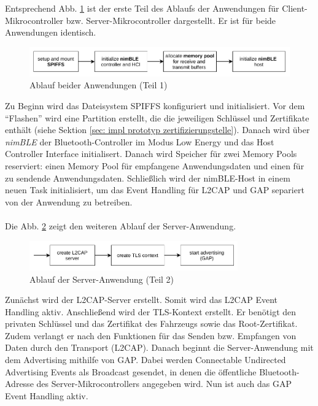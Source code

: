 Entsprechend Abb. \ref{fig: impl ablauf anwendung teil 1} ist der erste Teil des Ablaufs der Anwendungen für Client-Mikrocontroller bzw. Server-Mikrocontroller dargestellt. Er ist für beide Anwendungen identisch.
\begin{figure}[H]
    \centering
    \includegraphics[width=1\textwidth]{graphics/ablauf_anwendung_teil_1.pdf}
    \caption[Ablauf beider Anwendungen (Teil 1)]{Ablauf beider Anwendungen (Teil 1)}
    \label{fig: impl ablauf anwendung teil 1}
\end{figure}
Zu Beginn wird das Dateisystem SPIFFS konfiguriert und initialisiert. Vor dem "`Flashen"' wird eine Partition erstellt, die die jeweiligen Schlüssel und Zertifikate enthält (siehe Sektion \ref{sec: impl prototyp zertifizierungstelle}). Danach wird über \textit{nimBLE} der Bluetooth-Controller im Modus Low Energy und das Host Controller Interface initialisert. Danach wird Speicher für zwei Memory Pools reserviert: einen Memory Pool für empfangene Anwendungsdaten und einen für zu sendende Anwendungsdaten. Schließlich wird der nimBLE-Host in einem neuen Task initialisiert, um das Event Handling für L2CAP und GAP separiert von der Anwendung zu betreiben.
\\\\
Die Abb. \ref{fig: impl ablauf anwendung server teil 2} zeigt den weiteren Ablauf der Server-Anwendung.
\begin{figure}[H]
    \centering
    \includegraphics[width=0.8\textwidth]{graphics/ablauf_anwendung_teil_2_server.pdf}
    \caption[Ablauf der Server-Anwendung (Teil 2)]{Ablauf der Server-Anwendung (Teil 2)}
    \label{fig: impl ablauf anwendung server teil 2}
\end{figure}
Zunächst wird der L2CAP-Server erstellt. Somit wird das L2CAP Event Handling aktiv. Anschließend wird der TLS-Kontext erstellt. Er benötigt den privaten Schlüssel und das Zertifikat des Fahrzeugs sowie das Root-Zertifikat. Zudem verlangt er nach den Funktionen für das Senden bzw. Empfangen von Daten durch den Transport (L2CAP). Danach beginnt die Server-Anwendung mit dem Advertising mithilfe von GAP. Dabei werden Connectable Undirected Advertising Events als Broadcast gesendet, in denen die öffentliche Bluetooth-Adresse des Server-Mikrocontrollers angegeben wird. Nun ist auch das GAP Event Handling aktiv.
